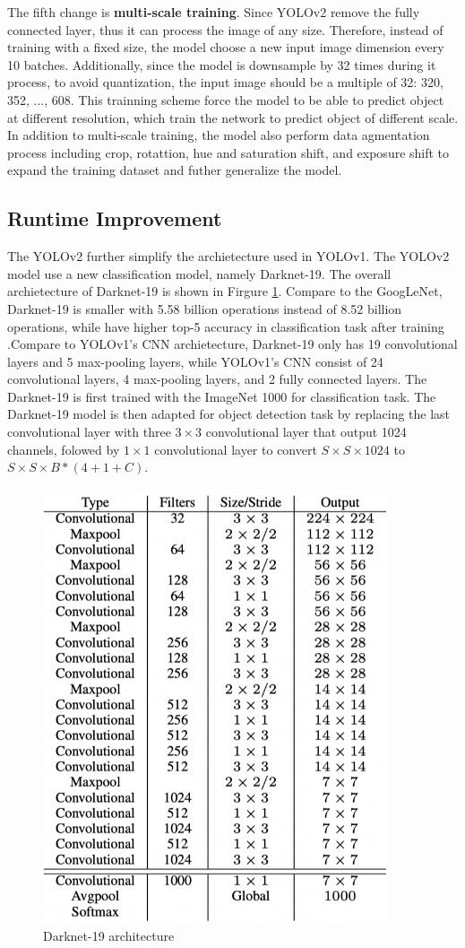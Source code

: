 The fifth change is \textbf{multi-scale training}. Since YOLOv2 remove the fully connected layer, thus it can process the image of any size. Therefore, instead of training with a fixed size, the model choose a new input image dimension every 10 batches. Additionally, since the model is downsample by 32 times during it process, to avoid quantization, the input image should be a multiple of 32: {320, 352, ..., 608}. This trainning scheme force the model to be able to predict object at different resolution, which train the network to predict object of different scale. In addition to multi-scale training, the model also perform data agmentation process including crop, rotattion, hue and saturation shift, and exposure shift to expand the training dataset and futher generalize the model.

\subsection{Runtime Improvement}
The YOLOv2 further simplify the archietecture used in YOLOv1. The YOLOv2 model use a new classification model, namely Darknet-19. The overall archietecture of Darknet-19 is shown in Firgure \ref{fig:darknet19_archite}. Compare to the GoogLeNet, Darknet-19 is smaller with 5.58 billion operations instead of 8.52 billion operations, while have higher top-5 accuracy in classification task after training \cite{yolo9000_2017}.Compare to YOLOv1's CNN archietecture, Darknet-19 only has 19 convolutional layers and 5 max-pooling layers, while YOLOv1's CNN consist of 24 convolutional layers, 4 max-pooling layers, and 2 fully connected layers. The Darknet-19 is first trained with the ImageNet 1000 for classification task. The Darknet-19 model is then adapted for object detection task by replacing the last convolutional layer with three $3 \times 3$ convolutional layer that output 1024 channels, folowed by $1 \times 1$ convolutional layer to convert $S \times S \times 1024$ to $S \times S \times B*(4+1+C)$.

\begin{figure}[!ht]
    \centering
    \includegraphics[width=4in]{figures/darknet19_archite.png}
    \caption{Darknet-19 architecture \cite{yolo9000_2017}} 
    \label{fig:darknet19_archite}
\end{figure}
